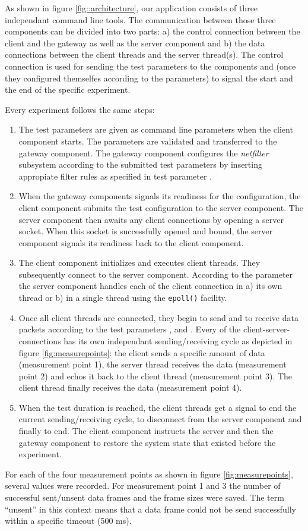 \documentclass{sig-alternate}
\begin{document}
\noindent As shown in figure \ref{fig::architecture}, our application consists 
of three independant command line tools. The communication between those three 
components can be divided into two parts: a) the control connection between the 
client and the gateway as well as the server component and b) the data 
connections between the client threads and the server thread(s). The control 
connection is used for sending the test parameters to the components and 
(once they configured themselfes according to the parameters) to signal the 
start and the end of the specific experiment.

\noindent Every experiment follows the same steps:
\begin{enumerate}
\item The test parameters are given as command line pa\-ra\-me\-ters when the 
client component starts. The parameters are validated and transferred to the 
gateway component. The gateway component configures the \emph{netfilter} 
subsystem according to the submitted test parameters by inserting appropiate 
filter rules as specified in test parameter .
\item When the gateway components signals its readiness for the configuration, 
the client component submits the test configuration to the server component. 
The server component then awaits any client connections by opening a server 
socket. When this socket is successfully opened and bound, the server component
signals its readiness back to the client component.
\item The client component initializes and executes  client threads. They
subsequently connect to the server component. According to the parameter  
the server component handles each of the client connection in a) its own thread 
or b) in a single thread using the \texttt{epoll()} facility.
\item Once all client threads are connected, they begin to send and to receive 
data packets according to the test parameters , and . Every of the  
client-server-connections has its own independant sending/receiving cycle as 
depicted in fi\-gu\-re \ref{fig:measurepoints}: the client sends a specific 
amount of data (measurement point 1), the server thread receives the data 
(measurement point 2) and echos it back to the client thread (measurement point 
3). The client thread finally receives the data (measurement point 4).
\item When the test duration  is reached, the client threads get a signal to 
end the current sending/re\-cei\-ving cycle, to disconnect from the server 
component and finally to end. The client component instructs the server and 
then the gateway component to restore the system state that existed before the 
ex\-pe\-ri\-ment.
\end{enumerate}
For each of the four measurement points as shown in fi\-gu\-re
\ref{fig:measurepoints}, several values were recorded. For measurement point 1
and 3 the number of successful sent/unsent data frames and the frame sizes were
saved. The term ``unsent'' in this context means that a data frame could not be
send successfully within a specific timeout (500 ms).
\end{document}
